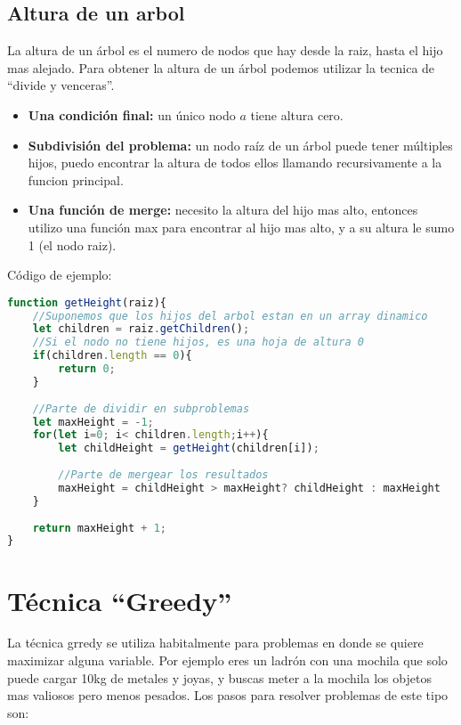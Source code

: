 \subsection{Altura de un arbol}

La altura de un árbol es el numero de nodos que hay desde la raiz, hasta el hijo mas alejado. Para obtener la altura de un árbol podemos utilizar la tecnica de ``divide y venceras''. 

\begin{itemize}
    \item \textbf{Una condición final:} un único nodo $a$ tiene altura cero.
    \item \textbf{Subdivisión del problema:} un nodo raíz de un árbol puede tener múltiples hijos, puedo encontrar la altura de todos ellos llamando recursivamente a la funcion principal.
    \item \textbf{Una función de merge:} necesito la altura del hijo mas alto, entonces utilizo una función max para encontrar al hijo mas alto, y a su altura le sumo 1 (el nodo raiz). 
\end{itemize}


Código de ejemplo:

\begin{lstlisting}[language=JavaScript, caption=Altura de un arbol]
function getHeight(raiz){
    //Suponemos que los hijos del arbol estan en un array dinamico
    let children = raiz.getChildren();
    //Si el nodo no tiene hijos, es una hoja de altura 0
    if(children.length == 0){
        return 0;
    }
    
    //Parte de dividir en subproblemas
    let maxHeight = -1;
    for(let i=0; i< children.length;i++){
        let childHeight = getHeight(children[i]);
        
        //Parte de mergear los resultados
        maxHeight = childHeight > maxHeight? childHeight : maxHeight
    }
    
    return maxHeight + 1;
}
\end{lstlisting}

\section{Técnica ``Greedy''}

La técnica grredy se utiliza habitalmente para problemas en donde se quiere maximizar alguna variable. Por ejemplo eres un ladrón con una mochila que solo puede cargar 10kg de metales y joyas, y buscas meter a la mochila los objetos mas valiosos pero menos pesados. Los pasos para resolver problemas de este tipo son:

